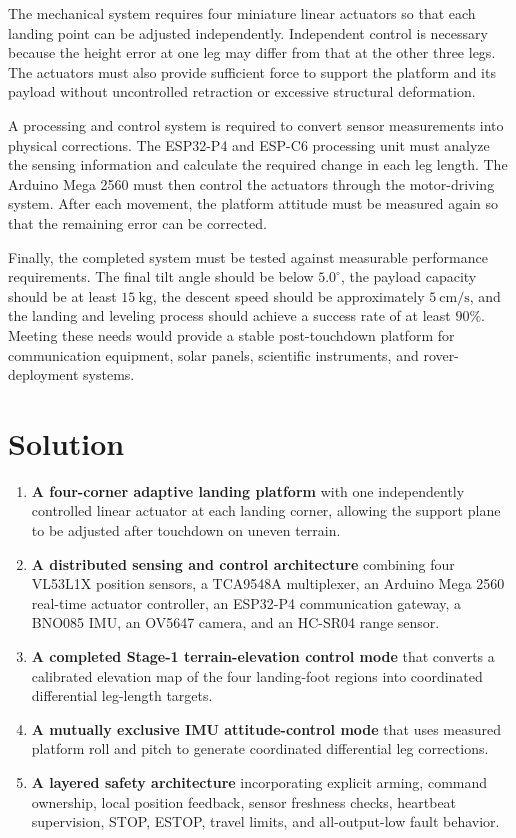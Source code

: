 \documentclass{engr1000j-s2}
\begin{document}
The mechanical system requires four miniature linear actuators so that each landing point can be adjusted independently. Independent control is necessary because the height error at one leg may differ from that at the other three legs. The actuators must also provide sufficient force to support the platform and its payload without uncontrolled retraction or excessive structural deformation.

A processing and control system is required to convert sensor measurements into physical corrections. The ESP32-P4 and ESP-C6 processing unit must analyze the sensing information and calculate the required change in each leg length. The Arduino Mega 2560 must then control the actuators through the motor-driving system. After each movement, the platform attitude must be measured again so that the remaining error can be corrected.

Finally, the completed system must be tested against measurable performance requirements. The final tilt angle should be below \(5.0^\circ\), the payload capacity should be at least \(15~\mathrm{kg}\), the descent speed should be approximately \(5~\mathrm{cm/s}\), and the landing and leveling process should achieve a success rate of at least \(90\%\). Meeting these needs would provide a stable post-touchdown platform for communication equipment, solar panels, scientific instruments, and rover-deployment systems.

\newpage


\section{Solution}


\begin{enumerate}
    \item \textbf{A four-corner adaptive landing platform} with one independently controlled linear actuator at each landing corner, allowing the support plane to be adjusted after touchdown on uneven terrain.
    \item \textbf{A distributed sensing and control architecture} combining four VL53L1X position sensors, a TCA9548A multiplexer, an Arduino Mega 2560 real-time actuator controller, an ESP32-P4 communication gateway, a BNO085 IMU, an OV5647 camera, and an HC-SR04 range sensor.
    \item \textbf{A completed Stage-1 terrain-elevation control mode} that converts a calibrated elevation map of the four landing-foot regions into coordinated differential leg-length targets.
    \item \textbf{A mutually exclusive IMU attitude-control mode} that uses measured platform roll and pitch to generate coordinated differential leg corrections.
    \item \textbf{A layered safety architecture} incorporating explicit arming, command ownership, local position feedback, sensor freshness checks, heartbeat supervision, STOP, ESTOP, travel limits, and all-output-low fault behavior.
\end{enumerate}
\end{document}
